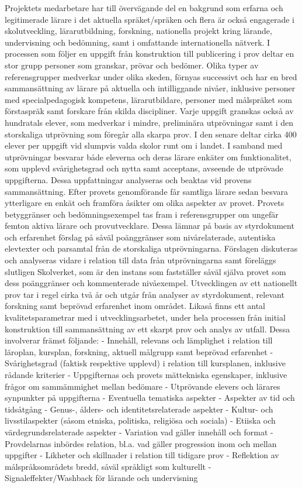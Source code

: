 Projektets medarbetare har till övervägande del en bakgrund som erfarna och legitimerade lärare i det aktuella spräket/spräken och flera är också engagerade i skolutveckling, lärarutbildning, forskning, nationella projekt kring lärande, undervisning och bedömning, samt i omfattande internationella nätverk.
I processen som följer en uppgift från konstruktion till publicering i prov deltar en stor grupp personer som granskar, prövar och bedömer. Olika typer av referensgrupper medverkar under olika skeden, förnyas successivt och har en bred sammansättning av lärare på aktuella och intilliggande nivåer, inklusive personer med specialpedagogisk kompetens, lärarutbildare, personer med målspräket som förstaspräk samt forskare från skilda discipliner.
Varje uppgift granskas också av hundratals elever, som medverkar i mindre, preliminära utprövningar samt i den storskaliga utprövning som föregår alla skarpa prov. I den senare deltar cirka 400 elever per uppgift vid slumpvis valda skolor runt om i landet. I samband med utprövningar besvarar både eleverna och deras lärare enkäter om funktionalitet, som upplevd svårighetsgrad och nytta samt acceptans, avseende de utprövade uppgifterna. Dessa uppfattningar analyseras och beaktas vid provens sammansättning. Efter provets genomförande får samtliga lärare sedan besvara ytterligare en enkät och framföra åsikter om olika aspekter av provet.
Provets betyggränser och bedömningsexempel tas fram i referensgrupper om ungefär femton aktiva lärare och provutvecklare. Dessa lämnar på basis av styrdokument och erfarenhet förslag på såväl poänggränser som nivårelaterade, autentiska elevtexter och parsamtal från de storskaliga utprövningarna. Förslagen diskuteras och analyseras vidare i relation till data från utprövningarna samt föreläggs slutligen Skolverket, som är den instans som fastställer såväl själva provet som dess poänggränser och kommenterade nivåexempel.
Utvecklingen av ett nationellt prov tar i regel cirka två år och utgår från analyser av styrdokument, relevant forskning samt beprövad erfarenhet inom området. Likaså finns ett antal kvalitetsparametrar med i utvecklingsarbetet, under hela processen från initial konstruktion till sammansättning av ett skarpt prov och analys av utfall. Dessa involverar främst följande:
- Innehåll, relevans och lämplighet i relation till läroplan, kursplan, forskning, aktuell målgrupp samt beprövad erfarenhet
- Svårighetsgrad (faktisk respektive upplevd) i relation till kursplanen, inklusive rådande kriterier
- Uppgifternas och provets mättekniska egenskaper, inklusive frågor om sammämmighet mellan bedömare
- Utprövande elevers och lärares synpunkter på uppgifterna
- Eventuella tematiska aspekter
- Aspekter av tid och tidsåtgång
- Genus-, ålders- och identitetsrelaterade aspekter
- Kultur- och livsstilaspekter (såsom etniska, politiska, religiösa och sociala)
- Etiiska och värdegrundsrelaterade aspekter
- Variation vad gäller innehåll och format
- Provdelarnas inbördes relation, bl.a. vad gäller progression inom och mellan uppgifter
- Likheter och skillnader i relation till tidigare prov
- Reflektion av målspråksområdets bredd, såväl språkligt som kulturellt
- Signaleffekter/Washback för lärande och undervisning


